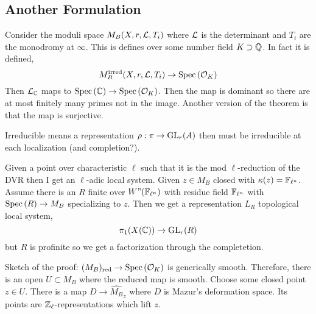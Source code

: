 \documentclass[12pt]{article}
\begin{document}
\subsection{Another Formulation}

\newcommand{\irred}{\mathrm{irred}}

Consider the moduli space $M_B(X, r, \mathcal{L}, T_i)$ where $\mathcal{L}$ is the determinant and $T_i$ are the monodromy at $\infty$. This is defines over some number field $K \supset \mathbb{Q}$. In fact it is defined,
\[ M^{\irred}_B(X, r, \L, T_i) \to \Spec{\struct{K}} \]
Then $\mathcal{L}_{\mathbb{C}}$ maps to $\mathrm{Spec}\left( \mathbb{C} \right) \to \mathrm{Spec}\left( \mathcal{O}_{K} \right)$. Then the map is dominant so there are at most finitely many primes not in the image. Another version of the theorem is that the map is surjective. 

\begin{rmk}
Irreducible means a representation $\rho : \pi \to \mathrm{GL}_r(A)$ then must be irreducible at each localization (and completion?).
\end{rmk}

\begin{rmk}
Given a point over characteristic $\ell$ such that it is the mod $\ell$-reduction of the DVR then I get an $\ell$-adic local system. Given $z \in M_B$ closed with $\kappa(z) = \mathbb{F}_{\ell^n}$. Assume there is an $R$ finite over $W"(\mathbb{F}_{\ell^n})$ with residue field $\mathbb{F}_{\ell^n}$ with $\mathrm{Spec}\left( R \right) \to M_B$ specializing to $z$. Then we get a representation $L_R$ topological local system,
\[ \pi_1(X(\mathbb{C})) \to \mathrm{GL}_r(R) \]
but $R$ is profinite so we get a factorization through the completetion. 
\end{rmk}

Sketch of the proof: $(M_B)_{\mathrm{red}} \to \mathrm{Spec}\left( \mathcal{O}_{K} \right)$ is generically smooth. Therefore, there is an open $U \subset M_B$ where the reduced map is smooth. Choose some closed point $z \in U$. There is a map $D \to \widehat{M_B}_z$ where $D$ is Mazur's deformation space. Its points are $\mathbb{Z}_\ell$-representations which lift $z$. 
\end{document}
